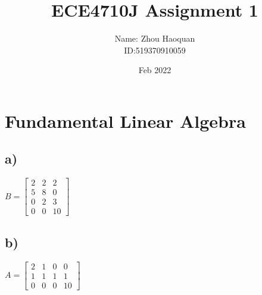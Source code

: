 \documentclass[12pt]{report}
\title
{
    {ECE4710J Assignment 1}
}
\author
{
        {Name: Zhou Haoquan}\\
        {ID:519370910059}\\        
}
\date{Feb 2022}
\begin{document}
\maketitle
\newpage

\section{Fundamental Linear Algebra}
\subsection*{a)}
\begin{center}
    $B = \begin{bmatrix}
    2 & 2 & 2 \\
    5 & 8 & 0 \\
    0 & 2 & 3 \\
    0 & 0 & 10
    \end{bmatrix}$
\end{center}

\subsection*{b)}
\begin{center}
    $ A = \begin{bmatrix}
    2 & 1 & 0 & 0 \\
    1 & 1 & 1 & 1 \\
    0 & 0 & 0 & 10
    \end{bmatrix}
    $
\end{center}
\end{document}
